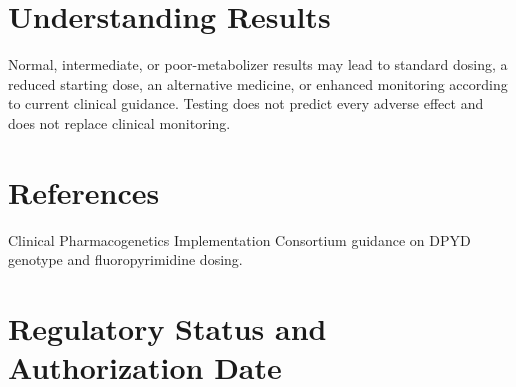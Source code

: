\section*{Understanding Results}
Normal, intermediate, or poor-metabolizer results may lead to standard dosing, a reduced starting dose, an alternative medicine, or enhanced monitoring according to current clinical guidance. Testing does not predict every adverse effect and does not replace clinical monitoring.

\section*{References}
Clinical Pharmacogenetics Implementation Consortium guidance on DPYD genotype and fluoropyrimidine dosing.

\clearpage


\section*{Regulatory Status and Authorization Date}

\clearpage
